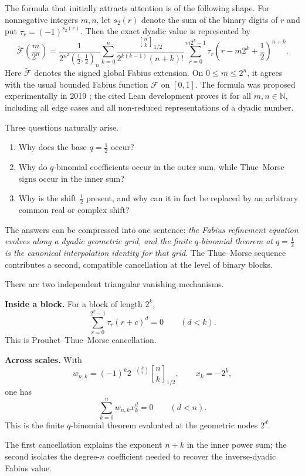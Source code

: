 \documentclass[11pt,oneside]{article}
\theoremstyle{definition}
\theoremstyle{remark}
\newcommand{\qpoch}[3]{\left(#1;#2\right)_{#3}}
\newcommand{\halfqbinom}[2]{{\genfrac{[}{]}{0pt}{}{#1}{#2}}_{1/2}}
\newcommand{\F}{\mathcal F}
\newcommand{\G}{\widetilde{\mathcal F}}
\newcommand{\N}{\mathbb N}
\newcommand{\tm}{\tau}
\begin{document}
The formula that initially attracts attention is of the following shape.  For nonnegative integers $m,n$, let $s_2(r)$ denote the sum of the binary digits of $r$ and put $\tm_r=(-1)^{s_2(r)}$.  Then the exact dyadic value is represented by
\begin{equation}\label{p3:eq:headline}
\boxed{
\G\!\left(\frac{m}{2^n}\right)
=
\frac{1}{2^{n^2}\qpoch{\frac12}{\frac12}{n}}
\sum_{k=0}^{n}
\frac{\halfqbinom{n}{k}}
     {2^{k(k-1)}(n+k)!}
\sum_{r=0}^{m2^k-1}
\tm_r\left(r-m2^k+\frac12\right)^{n+k}.}
\end{equation}
Here $\G$ denotes the signed global Fabius extension.  On $0\le m\le 2^n$, it agrees with the usual bounded Fabius function $\F$ on $[0,1]$.  The formula was proposed experimentally in 2019 \cite{p3:ReshetnikovMSE}; the cited Lean development proves it for all $m,n\in\N$, including all edge cases and all non-reduced representations of a dyadic number.

Three questions naturally arise.

\begin{enumerate}[label=\textbf{Q\arabic*.},leftmargin=3.2em]
\item Why does the base $q=\tfrac12$ occur?
\item Why do $q$-binomial coefficients occur in the outer sum, while Thue--Morse signs occur in the inner sum?
\item Why is the shift $\tfrac12$ present, and why can it in fact be replaced by an arbitrary common real or complex shift?
\end{enumerate}

The answers can be compressed into one sentence: \emph{the Fabius refinement equation evolves along a dyadic geometric grid, and the finite $q$-binomial theorem at $q=\tfrac12$ is the canonical interpolation identity for that grid}.  The Thue--Morse sequence contributes a second, compatible cancellation at the level of binary blocks.

\begin{keybox}
There are two independent triangular vanishing mechanisms.

\medskip
\noindent\textbf{Inside a block.} For a block of length $2^k$,
\[
  \sum_{r=0}^{2^k-1}\tm_r(r+c)^d=0\qquad(d<k).
\]
This is Prouhet--Thue--Morse cancellation.

\medskip
\noindent\textbf{Across scales.} With
\[
 w_{n,k}=(-1)^k2^{-\binom{k}{2}}\halfqbinom{n}{k},
 \qquad x_k=-2^k,
\]
one has
\[
  \sum_{k=0}^{n}w_{n,k}x_k^d=0\qquad(d<n).
\]
This is the finite $q$-binomial theorem evaluated at the geometric nodes $2^d$.

\medskip
The first cancellation explains the exponent $n+k$ in the inner power sum; the second isolates the degree-$n$ coefficient needed to recover the inverse-dyadic Fabius value.
\end{keybox}
\end{document}
